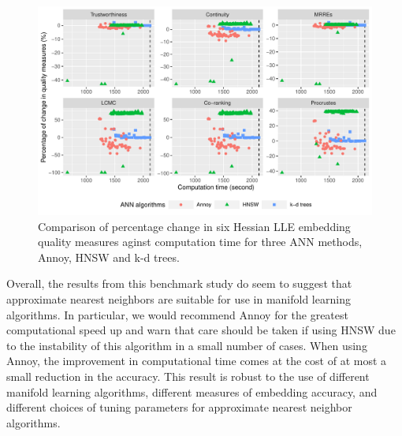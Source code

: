 \documentclass[11pt,a4paper,]{article}
\begin{document}
\begin{figure}

{\centering \includegraphics[width=1\linewidth]{mlann_ebs_files/figure-latex/hllemeasure-1} 

}

\caption{Comparison of percentage change in six Hessian LLE embedding quality measures aginst computation time for three ANN methods, Annoy, HNSW and k-d trees. }\label{fig:hllemeasure}
\end{figure}

\begin{table}

\caption{\label{tab:nnmeasure}Quality measures using true nearest neighbors for four manifold learning methods. All quality measures range from 0 to 1 where higher value indicates a better embedding. }
\centering
{}
\end{table}

Overall, the results from this benchmark study do seem to suggest that approximate nearest neighbors are suitable for use in manifold learning algorithms. In particular, we would recommend Annoy for the greatest computational speed up and warn that care should be taken if using HNSW due to the instability of this algorithm in a small number of cases. When using Annoy, the improvement in computational time comes at the cost of at most a small reduction in the accuracy. This result is robust to the use of different manifold learning algorithms, different measures of embedding accuracy, and different choices of tuning parameters for approximate nearest neighbor algorithms.
\end{document}
